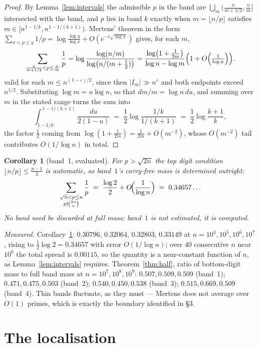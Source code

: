 \documentclass[11pt]{article}
\newtheorem{corollary}[theorem]{Corollary}
\begin{document}
\begin{proof}
By Lemma~\ref{lem:intervals} the admissible $p$ in the band are
$\bigcup_m\bigl(\frac{n}{m+1/2},\frac nm\bigr]$ intersected with the band, and
$p$ lies in band $k$ exactly when $m=\lfloor n/p\rfloor$ satisfies
$m\in[n^{1-1/k},n^{1-1/(k+1)})$.  Mertens' theorem in the form
$\sum_{x<p\le y}1/p=\log\frac{\log y}{\log x}+O(e^{-c\sqrt{\log x}})$ gives, for
each $m$,
\[
  \sum_{\frac{n}{m+1/2}<p\le\frac nm}\frac1p
  =\log\frac{\log(n/m)}{\log\bigl(n/(m+\tfrac12)\bigr)}
  =\frac{\log\bigl(1+\tfrac1{2m}\bigr)}{\log n-\log m}\Bigl(1+O\Bigl(\tfrac1{\log n}\Bigr)\Bigr).
\]
valid for each $m\le n^{(1-\varepsilon)/2}$, since then $|I_m|\gg n^{\varepsilon}$
and both endpoints exceed $n^{1/2}$.  Substituting $\log m=u\log n$, so that
$dm/m=\log n\,du$, and summing over $m$ in the stated range turns the sum into
\[
  \int_{1-1/k}^{\,1-1/(k+1)}\frac{du}{2(1-u)}
  \;=\;\frac12\log\frac{1/k}{1/(k+1)}
  \;=\;\frac12\log\frac{k+1}{k},
\]
the factor $\tfrac12$ coming from $\log(1+\tfrac1{2m})=\tfrac1{2m}+O(m^{-2})$,
whose $O(m^{-2})$ tail contributes $O(1/\log n)$ in total.
\end{proof}

\begin{corollary}[band~1, evaluated]\label{cor:band1}
For $p>\sqrt{2n}$ the top digit condition $\lfloor n/p\rfloor\le\frac{p-1}2$ is
automatic, so band~$1$'s carry-free mass is determined outright:
\[
  \sum_{\substack{\sqrt n<p\le n\\ p\nmid\binom{2n}{n}}}\frac1p
  \;=\;\frac{\log2}{2}+O\!\Bigl(\frac1{\log n}\Bigr)\;=\;0.34657\ldots
\]
No band need be discarded at full mass; band~$1$ is not estimated, it is
computed.
\end{corollary}

\emph{Measured.}  Corollary~\ref{cor:band1}: $0.30796,\,0.32064,\,0.32803,\,
0.33149$ at $n=10^4,10^5,10^6,10^7$, rising to $\tfrac12\log2=0.34657$ with
error $O(1/\log n)$; over $40$ consecutive $n$ near $10^6$ the total spread is
$0.00115$, so the quantity is a near-constant function of $n$, as
Lemma~\ref{lem:intervals} requires.  Theorem~\ref{thm:half}, ratio of
bottom-digit mass to full band mass at $n=10^7,10^8,10^9$:
$0.507,0.509,0.509$ (band~1); $0.471,0.475,0.503$ (band~2);
$0.540,0.450,0.538$ (band~3); $0.515,0.669,0.509$ (band~4).  Thin bands
fluctuate, as they must --- Mertens does not average over $O(1)$ primes, which
is exactly the boundary identified in \S3.

\section{The localisation}
\end{document}
